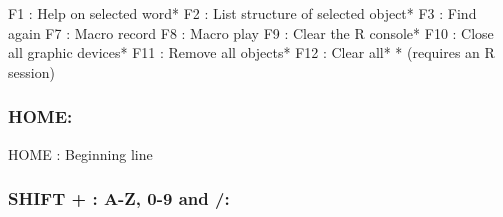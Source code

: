 \vspace{-0.5cm}
\begin{Rtables}[caption={[Function + keyboard shortcuts]
    Function + keyboard shortcuts},
  label=shortcut:funplus]
  F1  : Help on selected word*
  F2  : List structure of selected object*
  F3  : Find again
  F7  : Macro record
  F8  : Macro play
  F9  : Clear the R console*
  F10 : Close all graphic devices*
  F11 : Remove all objects*
  F12 : Clear all*
  * (requires an R session)
\end{Rtables}


\subsubsection{HOME:}

\vspace{-0.5cm}
\begin{Rtables}[caption={[HOME keyboard shortcut]
    HOME keyboard shortcut},
  label=shortcut:home]
  HOME : Beginning line
\end{Rtables}


\newpage
\subsubsection{SHIFT + : A-Z, 0-9 and /:}


